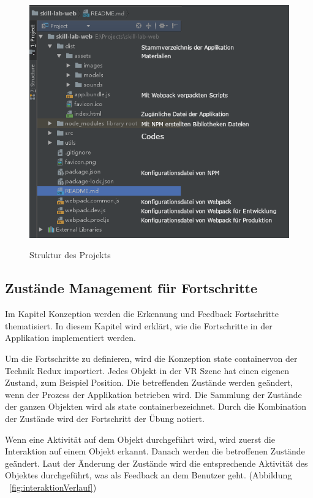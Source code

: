 \begin{figure}[ht]
\centering
\caption[Struktur des Projekts]{Struktur des Projekts}
\includegraphics[width=\textwidth]{images/projektSturktur.png}
\label{fig:projektStruktur} 
\end{figure}
 
 \subsection{Zustände Management für Fortschritte}
 Im Kapitel Konzeption werden die Erkennung und Feedback Fortschritte thematisiert. In diesem Kapitel wird erklärt, wie die Fortschritte in der Applikation implementiert werden.
 
 Um die Fortschritte zu definieren, wird die Konzeption \glqq state container\grqq von der Technik Redux importiert. Jedes Objekt in der VR Szene hat einen eigenen Zustand, zum Beispiel Position. Die betreffenden Zustände werden geändert, wenn der Prozess der Applikation betrieben wird. Die Sammlung der Zustände der ganzen Objekten wird als \glqq state container\grqq bezeichnet. Durch die Kombination der Zustände wird der Fortschritt der Übung notiert.
 
 Wenn eine Aktivität auf dem Objekt durchgeführt wird, wird zuerst die Interaktion auf einem Objekt erkannt. Danach werden die betroffenen Zustände geändert. Laut der Änderung der Zustände wird die entsprechende Aktivität des Objektes durchgeführt, was als Feedback an dem Benutzer geht. (Abbildung ~\ref{fig:interaktionVerlauf})
 
